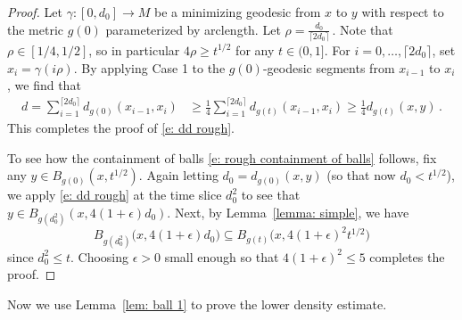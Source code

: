 \documentclass[11pt,reqno]{amsart}
\theoremstyle{remark}
\theoremstyle{definition}
\numberwithin{equation}{section}
\newcommand{\e}{{\epsilon}}
\begin{document}
\begin{proof}
 Let $\gamma:[0,d_0] \to M$ be a minimizing geodesic from $x$ to $y$ with respect to the metric $g(0)$ parameterized by arclength. Let 
$
	\rho = \frac{d_0}{\lceil 2d_0 \rceil }\,.
$
Note that $\rho\in [1/4, 1/2]$, so in particular $4\rho \geq t^{1/2}$ for any $t \in (0,1]$.
For $i = 0,\dots, \lceil 2d_0\rceil$, set $x_i =\gamma(i\rho)$. By applying Case 1 to the $g(0)$-geodesic segments from $x_{i-1}$ to $x_i$, we find that
\begin{align}
	d  = \sum_{i=1}^{\lceil 2d_0 \rceil} d_{g(0)}(x_{i-1}, x_i) & \geq \frac{1}{4} \sum_{i=1}^{\lceil 2d_0 \rceil} d_{g(t)}(x_{i-1}, x_i)   \geq \frac{1}{4} d_{g(t)}(x,y)\,.
\end{align}
This completes the proof of \eqref{e: dd rough}.\smallskip

To see how the containment of balls \eqref{e: rough containment of balls} follows, fix any $y \in B_{g(0)}(x,t^{1/2})$. Again letting $d_0 = d_{g(0)}(x,y)$ (so that now $d_0 < t^{1/2}$), we apply \eqref{e: dd rough} at the time slice $d_0^2$ to see that $y \in B_{g(d_0^2)}(x, 4(1+\e) d_0)$. Next, by Lemma~\ref{lemma: simple},  we have 
	\begin{equation}\label{eqn: bad containment of balls}
		B_{g(d_0^2)} \big(x, 4 (1+\e) d_0\big) \subseteq B_{g(t)}\big(x,4 (1+\e)^2t^{1/2} \big)
	\end{equation}
	since $d_0^2 \leq t$. Choosing $\e>0$ small enough so that $4(1+\e)^2\leq 5$ completes the proof.
\end{proof}
Now we  use Lemma~\ref{lem: ball 1} to prove the lower density estimate.
\end{document}
